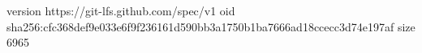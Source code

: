 version https://git-lfs.github.com/spec/v1
oid sha256:cfc368def9e033e6f9f236161d590bb3a1750b1ba7666ad18ccecc3d74e197af
size 6965
